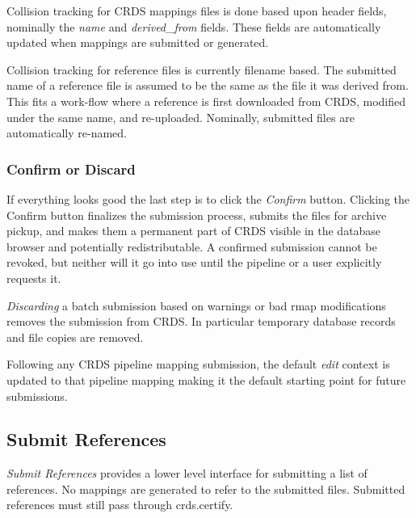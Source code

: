 \documentclass[letterpaper,10pt,english]{sphinxmanual}
\begin{document}
Collision tracking for CRDS mappings files is done based upon header fields,
nominally the \emph{name} and \emph{derived\_from} fields.  These fields are automatically
updated when mappings are submitted or generated.

Collision tracking for reference files is currently filename based.   The submitted
name of a reference file is assumed to be the same as the file it
was derived from.   This fits a work-flow where a reference is first downloaded
from CRDS, modified under the same name,  and re-uploaded.   Nominally,  submitted
files are automatically re-named.


\subsubsection{Confirm or Discard}
\label{web_site_use:confirm-or-discard}
If everything looks good the last step is to click the \emph{Confirm} button.
Clicking the Confirm button finalizes the submission process,  submits the files
for archive pickup,  and makes them a permanent part of CRDS visible in the
database browser and potentially redistributable.   A confirmed submission
cannot be revoked,  but neither will it go into use until the pipeline or a
user explicitly requests it.

\emph{Discarding} a batch submission based on warnings or bad rmap modifications
removes the submission from CRDS.   In particular temporary database records
and file copies are removed.

Following any CRDS pipeline mapping submission,  the default \emph{edit} context
is updated to that pipeline mapping making it the default starting point for
future submissions.


\subsection{Submit References}
\label{web_site_use:submit-references}
\emph{Submit References} provides a lower level interface for submitting a list of
references.   No mappings are generated to refer to the submitted files.
Submitted references must still pass through crds.certify.
\begin{figure}[htbp]
\centering

\end{figure}
\end{document}
